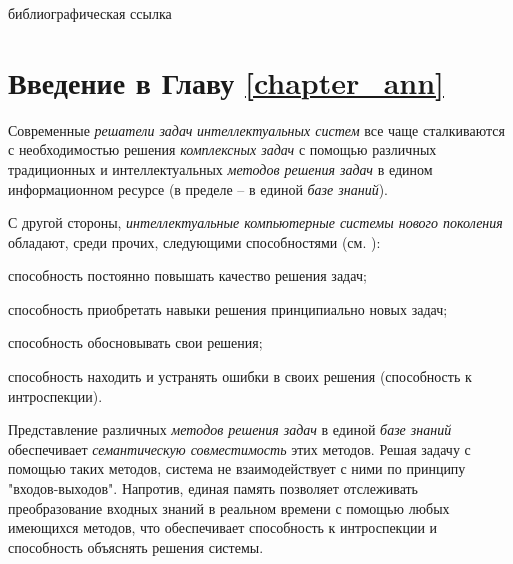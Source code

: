 \begin{SCn}
	\bigskip

	\begin{scnrelfromlist}{библиографическая ссылка}
	\end{scnrelfromlist}

\end{SCn}

\section*{Введение в Главу \ref{chapter_ann}}

Современные \textit{решатели задач} \textit{интеллектуальных систем} все чаще сталкиваются с необходимостью решения \textit{комплексных задач} с помощью различных традиционных и интеллектуальных \textit{методов решения задач} в едином информационном ресурсе (в пределе -- в единой \textit{базе знаний}).

С другой стороны, \textit{интеллектуальные компьютерные системы нового поколения} обладают, среди прочих, следующими способностями (см. ):
\begin{textitemize}
	\item способность постоянно повышать качество решения задач;
	\item способность приобретать навыки решения принципиально новых задач;
	\item способность обосновывать свои решения;
	\item способность находить и устранять ошибки в своих решения (способность к интроспекции).
\end{textitemize}

Представление различных \textit{методов решения задач} в единой \textit{базе знаний} обеспечивает \textit{семантическую совместимость} этих методов. Решая задачу с помощью таких методов, система не взаимодействует с ними по принципу "входов-выходов"{}. Напротив, единая память позволяет отслеживать преобразование входных знаний в реальном времени с помощью любых имеющихся методов, что обеспечивает способность к интроспекции и способность объяснять решения системы.

